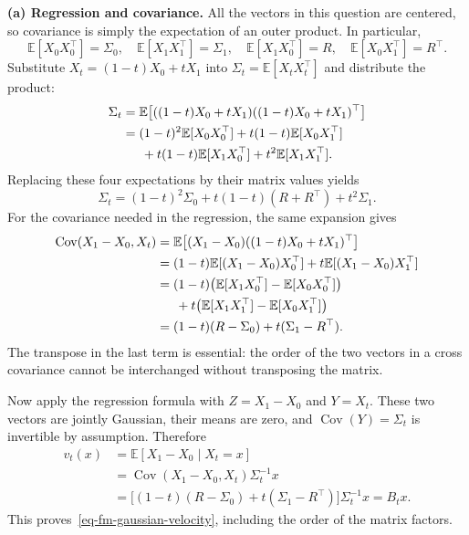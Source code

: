 \documentclass[11pt,a4paper]{article}
\theoremstyle{exostyle}
\newcommand{\EE}{\mathbb{E}}
\newcommand{\Cov}{\operatorname{Cov}}
\begin{document}
\begin{solution}
\par{}
\textbf{(a) Regression and covariance.}
All the vectors in this question are centered, so covariance is simply
the expectation of an outer product. In particular,
\[
  \EE[X_0X_0^\top]=\Sigma_0,\quad
  \EE[X_1X_1^\top]=\Sigma_1,\quad
  \EE[X_1X_0^\top]=R,\quad
  \EE[X_0X_1^\top]=R^\top.
\]
Substitute $X_t=(1-t)X_0+tX_1$ into $\Sigma_t=\EE[X_tX_t^\top]$
and distribute the product:
\begin{align*}
  \Sigma_t
    &=\EE\bigl[((1-t)X_0+tX_1)((1-t)X_0+tX_1)^\top\bigr]\\
    &=(1-t)^2\EE[X_0X_0^\top]
       +t(1-t)\EE[X_0X_1^\top]\\
    &\hspace{1.5em}+t(1-t)\EE[X_1X_0^\top]+t^2\EE[X_1X_1^\top].
\end{align*}
Replacing these four expectations by their matrix values yields
\begin{equation}\label{eq-fm-gaussian-covariance}
  \Sigma_t=(1-t)^2\Sigma_0+t(1-t)(R+R^\top)+t^2\Sigma_1.
\end{equation}
For the covariance needed in the regression, the same expansion gives
\begin{align*}
  \Cov(X_1-X_0,X_t)
    &=\EE\bigl[(X_1-X_0)((1-t)X_0+tX_1)^\top\bigr]\\
    &=(1-t)\EE[(X_1-X_0)X_0^\top]
         +t\EE[(X_1-X_0)X_1^\top]\\
    &=(1-t)\bigl(\EE[X_1X_0^\top]-\EE[X_0X_0^\top]\bigr)\\
    &\hspace{1.5em}+t\bigl(\EE[X_1X_1^\top]-\EE[X_0X_1^\top]\bigr)\\
    &=(1-t)(R-\Sigma_0)+t(\Sigma_1-R^\top).
\end{align*}
The transpose in the last term is essential: the order of the two
vectors in a cross covariance cannot be interchanged without
transposing the matrix.

Now apply the regression formula with $Z=X_1-X_0$ and $Y=X_t$.
These two vectors are jointly Gaussian, their means are zero,
and $\Cov(Y)=\Sigma_t$ is invertible by assumption. Therefore
\begin{align*}
  v_t(x)
    &=\EE[X_1-X_0\mid X_t=x]\\
    &=\Cov(X_1-X_0,X_t)\Sigma_t^{-1}x\\
    &=\big[(1-t)(R-\Sigma_0)+t(\Sigma_1-R^\top)\big]\Sigma_t^{-1}x
     =B_tx.
\end{align*}
This proves~\eqref{eq-fm-gaussian-velocity}, including the order
of the matrix factors.


\end{solution}
\end{document}
